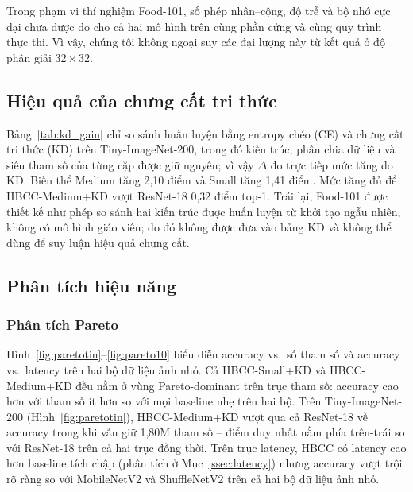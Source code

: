 \documentclass[conference]{IEEEtran}
\begin{document}
Trong phạm vi thí nghiệm Food-101, số phép nhân--cộng, độ trễ và bộ nhớ cực đại chưa được đo cho cả hai mô hình trên cùng phần cứng và cùng quy trình thực thi. Vì vậy, chúng tôi không ngoại suy các đại
lượng này từ kết quả ở độ phân giải $32\!\times\!32$. 

\subsection{Hiệu quả của chưng cất tri thức}

Bảng~\ref{tab:kd_gain} chỉ so sánh huấn luyện bằng entropy chéo (CE)
và chưng cất tri thức (KD) trên Tiny-ImageNet-200, trong đó kiến trúc,
phân chia dữ liệu và siêu tham số của từng cặp được giữ nguyên; vì
vậy $\Delta$ đo trực tiếp mức tăng do KD. Biến thể Medium tăng
2,10 điểm và Small tăng 1,41 điểm. Mức tăng đủ để
HBCC-Medium+KD vượt ResNet-18 0,32 điểm top-1. Trái lại, Food-101
được thiết kế như phép so sánh hai kiến trúc được huấn luyện từ khởi
tạo ngẫu nhiên, không có mô hình giáo viên; do đó không được đưa vào
bảng KD và không thể dùng để suy luận hiệu quả chưng cất.

\begin{table}[ht!]
  \caption{Mức tăng top-1 do KD trên Tiny-ImageNet-200
           ($\Delta$ = KD $-$ CE, cùng kiến trúc).}
  \label{tab:kd_gain}
  \centering
  \renewcommand{\arraystretch}{1.15}
\end{table}

\subsection{Phân tích hiệu năng}

\subsubsection{Phân tích Pareto}

Hình~\ref{fig:paretotin}--\ref{fig:pareto10} biểu diễn accuracy
vs.\ số tham số và accuracy vs.\ latency trên hai bộ dữ liệu ảnh nhỏ. Cả
HBCC-Small+KD và HBCC-Medium+KD đều nằm ở vùng Pareto-dominant
trên trục tham số: accuracy cao hơn với tham số ít hơn so với mọi
baseline nhẹ trên hai bộ. Trên Tiny-ImageNet-200
(Hình~\ref{fig:paretotin}), HBCC-Medium+KD vượt qua cả ResNet-18
về accuracy trong khi vẫn giữ 1,80M tham số -- điểm duy nhất nằm
phía trên-trái so với ResNet-18 trên cả hai trục đồng thời. Trên
trục latency, HBCC có latency cao hơn baseline tích chập (phân tích
ở Mục~\ref{ssec:latency}) nhưng accuracy vượt trội rõ ràng so với
MobileNetV2 và ShuffleNetV2 trên cả hai bộ dữ liệu ảnh nhỏ.
\end{document}
